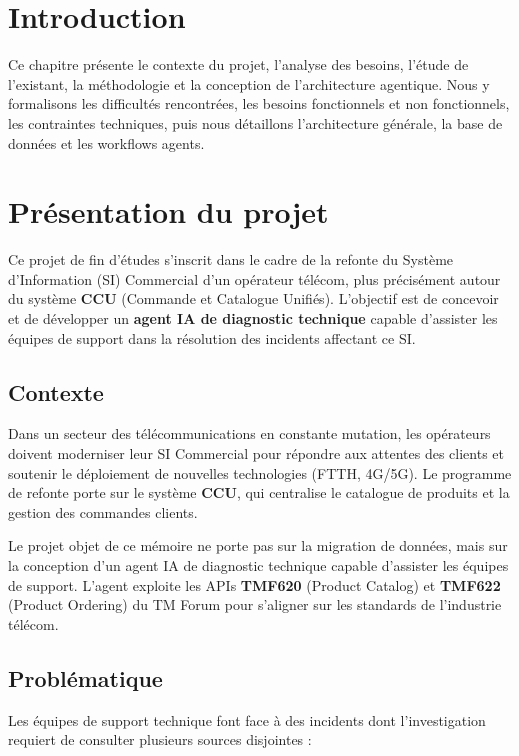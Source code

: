 \section*{Introduction}
Ce chapitre présente le contexte du projet, l'analyse des besoins, l'étude de l'existant, la méthodologie et la conception de l'architecture agentique. Nous y formalisons les difficultés rencontrées, les besoins fonctionnels et non fonctionnels, les contraintes techniques, puis nous détaillons l'architecture générale, la base de données et les workflows agents.

\section{Présentation du projet}
Ce projet de fin d'études s'inscrit dans le cadre de la refonte du Système d'Information (SI) Commercial d'un opérateur télécom, plus précisément autour du système \textbf{CCU} (Commande et Catalogue Unifiés). L'objectif est de concevoir et de développer un \textbf{agent IA de diagnostic technique} capable d'assister les équipes de support dans la résolution des incidents affectant ce SI.

\subsection{Contexte}
Dans un secteur des télécommunications en constante mutation, les opérateurs doivent moderniser leur SI Commercial pour répondre aux attentes des clients et soutenir le déploiement de nouvelles technologies (FTTH, 4G/5G). Le programme de refonte porte sur le système \textbf{CCU}, qui centralise le catalogue de produits et la gestion des commandes clients.

Le projet objet de ce mémoire ne porte pas sur la migration de données, mais sur la conception d'un agent IA de diagnostic technique capable d'assister les équipes de support. L'agent exploite les APIs \textbf{TMF620} (Product Catalog) et \textbf{TMF622} (Product Ordering) du TM Forum pour s'aligner sur les standards de l'industrie télécom.

\subsection{Problématique}
Les équipes de support technique font face à des incidents dont l'investigation requiert de consulter plusieurs sources disjointes :

